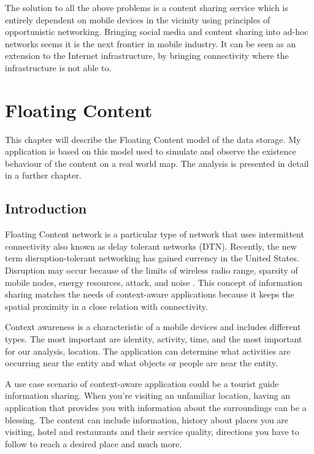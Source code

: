 The solution to all the above problems is a content sharing service which is
entirely dependent on mobile devices in the vicinity using principles of
opportunistic networking. Bringing social media and content sharing into ad-hoc
networks seems it is the next frontier in mobile industry. It can be seen as an
extension to the Internet infrastructure, by bringing connectivity where the
infrastructure is not able to.





\chapter{Floating Content} \label{chap2}


This chapter will describe the Floating Content model of the data storage.
My application is based on this model used to simulate and observe the existence
behaviour of the content on a real world map. The analysis is presented in
detail in a further chapter.

\section{Introduction}
Floating Content network is a particular type of network that uses intermittent
connectivity also known as delay tolerant networks (DTN). Recently, the new term
disruption-tolerant networking has gained currency in the United States.
Disruption may occur because of the limits of wireless radio range, sparsity of
mobile nodes, energy resources, attack, and noise \cite{wikipedia_dtn}.
This concept of information sharing matches the needs of context-aware
applications because it keeps the spatial proximity in a close relation with
connectivity.

Context awareness is a characteristic of a mobile devices and includes different
types. The most important are identity, activity, time, and the most important
for our analysis, location. The application can determine what activities are
occurring near the entity and what objects or people are near the entity.

A use case scenario of context-aware application could be a tourist guide
information sharing. When you're visiting an unfamiliar location, having an
application that provides you with information about the surroundings can be a
blessing. The content can include information, history about places you are
visiting, hotel and restaurants and their service quality, directions you have
to follow to reach a desired place and much more.

